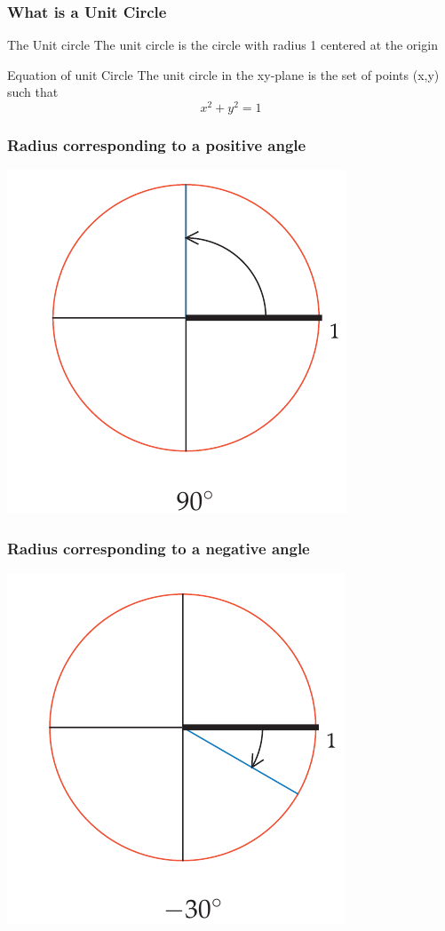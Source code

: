 \documentclass{beamer}
\begin{document}
\begin{frame}
\frametitle{What is a Unit Circle}
\begin{block}{The Unit circle}
    The unit circle is the circle with radius 1 centered at the origin 
\end{block}
\begin{block}{Equation of unit Circle}
    The unit circle in the xy-plane is the set of points (x,y) such that
    $$x^{2} + y^{2} = 1$$
    
\end{block}

\end{frame}

\begin{frame}
    \frametitle{Radius corresponding to a positive angle}
    \centering
    \includegraphics[scale=0.5]{1.png}

\end{frame}

\begin{frame}
    \frametitle{Radius corresponding to a negative angle}
    \centering
    \includegraphics[scale=0.5]{2.png}

\end{frame}
\end{document}
